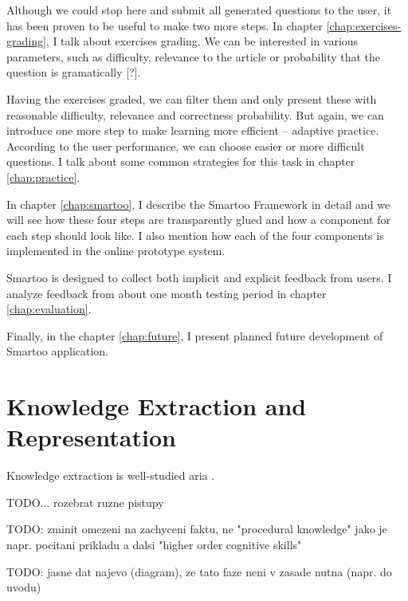 \documentclass[a4paper, 12pt, twoside]{fithesis2}		%
\renewcommand{\_}{\leavevmode \kern0.0em\vbox{\hrule width0.4em}}
\begin{document}
Although we could stop here and submit all generated questions to the user, it has been proven to be useful to make two more steps.
In chapter \ref{chap:exercises-grading}, I talk about exercises grading.
We can be interested in various parameters, such as difficulty, relevance to the article or probability that the question is gramatically [?].

Having the exercises graded, we can filter them and only present these with reasonable difficulty, relevance and correctness probability.
But again, we can introduce one more step to make learning more efficient -- adaptive practice.
According to the user performance, we can choose easier or more difficult questions. I talk about some common strategies for this task in chapter \ref{chap:practice}.

In chapter \ref{chap:smartoo}, I describe the Smartoo Framework in detail
and we will see how these four steps are transparently glued and how a component for each step should look like.
I also mention how each of the four components is implemented in the online prototype system.

Smartoo is designed to collect both implicit and explicit feedback from users.
I analyze feedback from about one month testing period in chapter \ref{chap:evaluation}.

Finally, in the chapter \ref{chap:future}, I present planned future development of Smartoo application.





\chapter{Knowledge Extraction and Representation}
\label{chap:knowledge}

Knowledge extraction is well-studied aria \parencite{triples-acquisition}.

TODO... rozebrat ruzne pistupy


TODO: zminit omezeni na zachyceni faktu, ne "procedural knowledge" jako je napr. pocitani prikladu a dalsi "higher order cognitive skills"



TODO: jasne dat najevo (diagram), ze tato faze neni v zasade nutna (napr. do uvodu)
\end{document}
